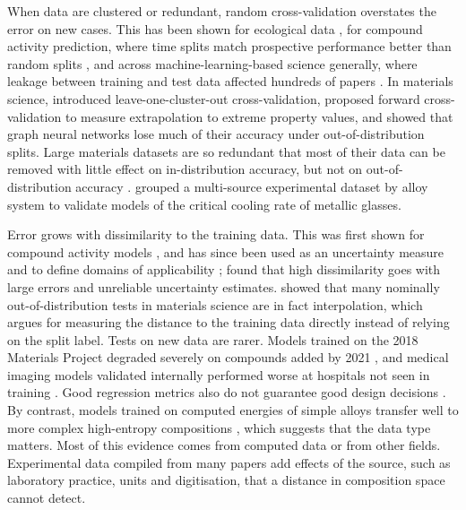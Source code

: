 When data are clustered or redundant, random cross-validation overstates the error on new cases. This
has been shown for ecological data \citep{roberts2017cross}, for compound activity prediction, where
time splits match prospective performance better than random splits \citep{sheridan2013time}, and
across machine-learning-based science generally, where leakage between training and test data
affected hundreds of papers \citep{kapoor2023leakage}. In materials science, \citet{meredig2018can}
introduced leave-one-cluster-out cross-validation, \citet{xiong2020evaluating} proposed forward
cross-validation to measure extrapolation to extreme property values, and \citet{omee2024structure}
showed that graph neural networks lose much of their accuracy under out-of-distribution splits.
Large materials datasets are so redundant that most of their data can be removed with little effect on
in-distribution accuracy, but not on out-of-distribution accuracy \citep{li2023exploiting}.
\citet{afflerbach2022machine} grouped a multi-source experimental dataset by alloy system to validate
models of the critical cooling rate of metallic glasses.

Error grows with dissimilarity to the training data. This was first shown for compound activity
models \citep{sheridan2004similarity}, and has since been used as an uncertainty measure
\citep{janet2019quantitative} and to define domains of applicability \citep{sutton2020identifying,
schultz2025general}; \citet{schultz2025general} found that high dissimilarity goes with large errors
and unreliable uncertainty estimates. \citet{li2025probing} showed that many nominally
out-of-distribution tests in materials science are in fact interpolation, which argues for measuring
the distance to the training data directly instead of relying on the split label. Tests on new data
are rarer. Models trained on the 2018 Materials Project degraded severely on compounds added by 2021
\citep{li2023critical}, and medical imaging models validated internally performed worse at hospitals
not seen in training \citep{zech2018variable}. Good regression metrics also do not guarantee good
design decisions \citep{bartel2020critical,borg2023quantifying}. By contrast, models trained on
computed energies of simple alloys transfer well to more complex high-entropy compositions
\citep{li2024efficient}, which suggests that the data type matters. Most of this evidence comes from
computed data or from other fields. Experimental data compiled from many papers add effects of the
source, such as laboratory practice, units and digitisation, that a distance in composition space
cannot detect.

